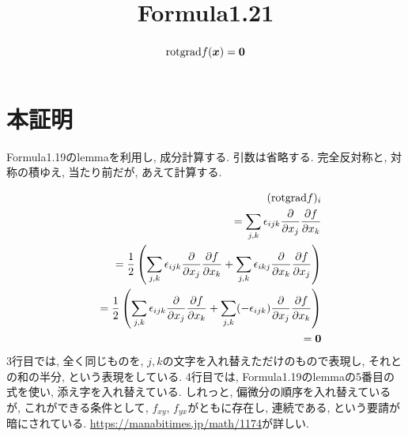 \documentclass{jsarticle}
\title{Formula1.21}
\newcommand*{\mbold}[1]{\mbox{\boldmath $#1$}}
\newcommand*{\grad}{{\rm grad}}
\newcommand*{\rot}{{\rm rot}}
\begin{document}
\maketitle

\begin{abstract}
  \begin{equation}
    \rot\grad f(\mbold{x}) = \mbold{0}
  \end{equation}
\end{abstract}

\section*{本証明}
Formula1.19のlemmaを利用し, 成分計算する. 引数は省略する. 
完全反対称と, 対称の積ゆえ, 当たり前だが, あえて計算する. 

\begin{eqnarray}
  && (\rot \grad f)_i \nonumber \\
  && = \sum_{j, k} \epsilon_{ijk}\frac{\partial}{\partial x_j}\frac{\partial f}{\partial x_k} \nonumber \\
  && = \frac{1}{2} \left( \sum_{j, k} \epsilon_{ijk}\frac{\partial}{\partial x_j}\frac{\partial f}{\partial x_k} + \sum_{j, k} \epsilon_{ikj}\frac{\partial}{\partial x_k}\frac{\partial f}{\partial x_j}\right)\nonumber \\
  && = \frac{1}{2} \left( \sum_{j, k} \epsilon_{ijk}\frac{\partial}{\partial x_j}\frac{\partial f}{\partial x_k} + \sum_{j, k} (-\epsilon_{ijk})\frac{\partial}{\partial x_j}\frac{\partial f}{\partial x_k}\right)\nonumber \\
  && = \mbold{0}
\end{eqnarray}
3行目では, 全く同じものを, $j, k$の文字を入れ替えただけのもので表現し, それとの和の半分, という表現をしている. 
4行目では, Formula1.19のlemmaの5番目の式を使い, 添え字を入れ替えている. 
しれっと, 偏微分の順序を入れ替えているが, これができる条件として, 
$f_{xy}$, $f_{yx}$がともに存在し, 連続である, という要請が暗にされている. 
\url{https://manabitimes.jp/math/1174}が詳しい. 
\end{document}
